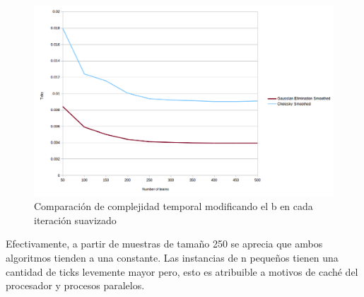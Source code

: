 \begin{figure}[h!]
  \begin{center}
	\includegraphics[scale=0.50]{imagenes/cuantitative/bChange/ColleyMatrixCuantitativeBChangeAnalysisConstant.png}
	\caption{Comparaci\'on de complejidad temporal modificando el b en cada iteraci\'on suavizado}
	\label{bChangeSmoothed}
  \end{center}
\end{figure}

Efectivamente, a partir de muestras de tama\~no 250 se aprecia que ambos algoritmos tienden a una constante. Las instancias de n peque\~nos tienen una cantidad de ticks levemente mayor pero, esto es atribuible a motivos de cach\'e del procesador y procesos paralelos.
